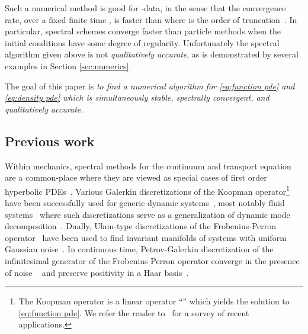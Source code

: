 \documentclass[final,leqno]{amsart}
\begin{document}
Such a numerical method is good for -data, in the sense that the convergence rate, over a fixed finite time , is faster than   where  is the order of truncation~\cite{Boyd2001,Gottlieb2001,Gottlieb1977numerical}.
In particular, spectral schemes converge faster than particle methods when the initial conditions have some degree of regularity.
Unfortunately the spectral algorithm given above is not \emph{qualitatively accurate}, as is demonstrated by several examples in Section \ref{sec:numerics}.

The goal of this paper is
\emph{to find a numerical algorithm for \eqref{eq:function pde} and \eqref{eq:density pde} which is simultaneously stable, spectrally convergent, and qualitatively accurate.}

\subsection{Previous work}
Within mechanics, spectral methods for the continuum and transport equation are a common-place where they are viewed as special cases of first order hyperbolic PDEs~\cite{Boyd2001,Gottlieb2001}.
Various Galerkin discretizations of the Koopman operator\footnote{The Koopman operator is a linear operator ``'' which yields the solution  to \eqref{eq:function pde}. We refer the reader to~\cite{BudisicMohrMezic2012} for a survey of recent applications.} have been successfully used for generic dynamic systems~\cite{BudisicMohrMezic2012,Mezic2005}, most notably fluid systems~\cite{Rowley2009} where such discretizations serve as a generalization of dynamic mode decomposition~\cite{Schmid2010}.
Dually, Ulam-type discretizations of the Frobenius-Perron operator~\cite{LasotaMackey1994,Ulam1947} have been used to find invariant manifolds of systems with uniform Gaussian noise~\cite{FroylandJungeKoltai2013,FroylandPadberg2009}.
In continuous time, Petrov-Galerkin discretization of the infinitesimal generator of the Frobenius Perron operator converge in the presence of noise ~\cite{BittracherKoltaiJunge2015} and preserve positivity in a Haar basis~\cite{koltai2011thesis}.
\end{document}
